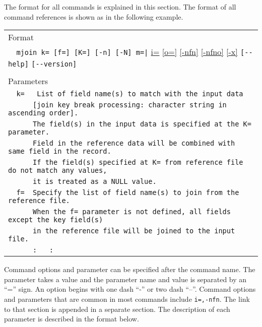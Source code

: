 %

The format for all commands is explained in this section. 
The format of all command references is shown as in the following example.

\begin{table}[htbp]
\begin{center}
\begin{tabular}{l}
\hline
{\large Format} \\
\verb/  mjoin k= [f=] [K=] [-n] [-N] m=|/ 
\hyperref[sect:option_i]{i=}
\hyperref[sect:option_o]{[o=]}
\hyperref[sect:option_nfn]{[-nfn]} 
\hyperref[sect:option_nfno]{[-nfno]}  
\hyperref[sect:option_x]{[-x]}
\verb|[--help]|
\verb|[--version]|\\

\\
{\large Parameters} \\
\verb|  k=   List of field name(s) to match with the input data |\\
\verb|      [join key break processing: character string in ascending order]. |\\
\verb|      The field(s) in the input data is specified at the K= parameter.|\\
\verb|      Field in the reference data will be combined with same field in the record. |\\
\verb|      If the field(s) specified at K= from reference file do not match any values,|\\
\verb|      it is treated as a NULL value.|\\
\verb|  f=  Specify the list of field name(s) to join from the reference file. |\\
\verb|      When the f= parameter is not defined, all fields except the key field(s) | \\
\verb|      in the reference file will be joined to the input file. |\\
\verb|      :   :|\\
\hline
\end{tabular} 
\end{center}
\end{table} 

Command options and parameter can be specified after the command name. The parameter takes a value and the parameter name and value is separated by an “=” sign. An option begins with one dash “-” or two dash “--”. Command options and parameters that are common in most commands include \verb|i=,-nfn|. The link to that section is appended in a separate section. The description of each parameter is described in the format below.

